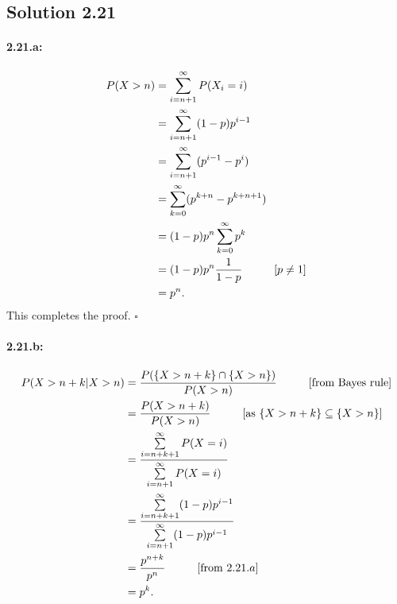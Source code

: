 \subsection*{Solution 2.21}
\paragraph{2.21.a:}
\begin{align*}
	P(X > n) &= \sum_{i=n+1}^{\infty}P(X_i=i)\\
	&= \sum_{i=n+1}^{\infty}(1-p)p^{i-1}\\
	&= \sum_{i=n+1}^{\infty}(p^{i-1}-p^i)\\
	&= \sum_{k=0}^{\infty}(p^{k+n}-p^{k+n+1})\\
	&= (1-p)p^n\sum_{k=0}^{\infty}p^k\\
	&= (1-p)p^n\frac{1}{1-p}\hspace*{1cm}[p \neq 1]\\
	&= p^n.
\end{align*}
This completes the proof. $\square$
\paragraph{2.21.b:}
\begin{align*}
	P(X > n+k|X > n) &= \frac{P(\{X > n+k\}\cap \{X > n\})}{P(X > n)}\hspace*{1cm}[\text{from Bayes rule}]\\
	&= \frac{P(X > n+k)}{P(X > n)}\hspace*{1cm}[\text{as $\{X>n+k\}\subseteq\{X>n\}$}]\\
	&= \frac{\sum\limits_{i=n+k+1}^{\infty}P(X=i)}{\sum\limits_{i=n+1}^{\infty}P(X=i)}\\
	&= \frac{\sum\limits_{i=n+k+1}^{\infty}(1-p)p^{i-1}}{\sum\limits_{i=n+1}^{\infty}(1-p)p^{i-1}}\\
	&= \frac{p^{n+k}}{p^{n}}\hspace*{1cm}[\text{from $2.21.a$}]\\
	&= p^k.
\end{align*}